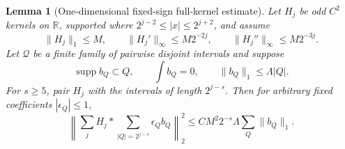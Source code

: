 \documentclass[11pt]{article}
\numberwithin{equation}{section}
\newtheorem{lemma}[theorem]{Lemma}
\theoremstyle{remark}
\theoremstyle{definition}
\newcommand{\R}{\mathbb R}
\newcommand{\supp}{\operatorname{supp}}
\begin{document}
\begin{lemma}[One-dimensional fixed-sign full-kernel estimate]
\label{lem:allq-fullkernel-1d}
Let $H_j$ be odd $C^2$ kernels on $\R$, supported where
$2^{j-2}\le|x|\le2^{j+2}$, and assume
\[
 \|H_j\|_1\le M,
 \qquad
 \|H_j'\|_\infty\le M2^{-2j},
 \qquad
 \|H_j''\|_\infty\le M2^{-3j}.
\]
Let $\mathcal Q$ be a finite family of pairwise disjoint intervals and
suppose
\[
 \supp b_Q\subset Q,\qquad \int b_Q=0,
 \qquad \|b_Q\|_1\le\Lambda|Q|.
\]
For $s\ge5$, pair $H_j$ with the intervals of length $2^{j-s}$.  Then for
arbitrary fixed coefficients $|\epsilon_Q|\le1$,
\begin{equation}\label{eq:allq-fullkernel-1d}
 \left\|\sum_jH_j*\!\sum_{|Q|=2^{j-s}}\epsilon_Qb_Q\right\|_2^2
 \le C M^2 2^{-s}\Lambda\sum_Q\|b_Q\|_1.
\end{equation}
\end{lemma}
\end{document}
